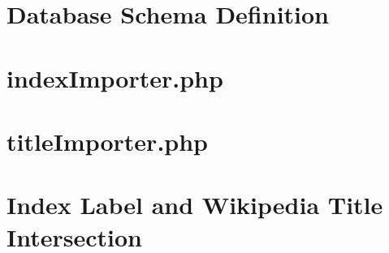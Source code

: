 \newpage \appendix \appendixpage \addappheadtotoc
\section{Database Schema Definition}


\section{indexImporter.php}


\section{titleImporter.php}


\section{Index Label and Wikipedia Title Intersection}
\begin{multicols}{2}

\end{multicols}